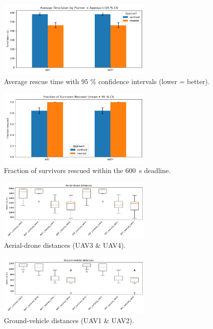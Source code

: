 \documentclass[12pt,a4paper]{report}
\begin{document}
\begin{figure}[H]
  \centering
  \includegraphics[width=0.68\textwidth]{figures/avg_time_taken.png}
  \caption{Average rescue time with 95 \% confidence intervals (lower = better).}
  \label{fig:avg_time_taken}
\end{figure}

\begin{figure}[H]
  \centering
  \includegraphics[width=0.68\textwidth]{figures/fraction_rescued.png}
  \caption{Fraction of survivors rescued within the \SI{600}{\second} deadline.}
  \label{fig:fraction_rescued}
\end{figure}

\begin{figure}[H]
  \centering
  \includegraphics[width=0.68\textwidth]{figures/aerial_distance_box.png}
  \caption{Aerial-drone distances (UAV3 & UAV4).}
  \label{fig:aerial_distance_box}
\end{figure}

\begin{figure}[H]
  \centering
  \includegraphics[width=0.68\textwidth]{figures/ground_distance_box.png}
  \caption{Ground-vehicle distances (UAV1 & UAV2).}
  \label{fig:ground_distance_box}
\end{figure}
\end{document}
